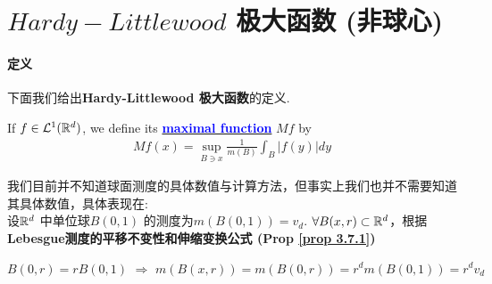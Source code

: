 \newpage
\section{$Hardy-Littlewood$ 极大函数 (非球心)}
\paragraph{定义}
	下面我们给出\textbf{Hardy-Littlewood 极大函数}的定义.
	\begin{defn}\label{def 4.1.1}
		If $f \in \mathcal{L}^{1}(\mathbb{R}^d)$, we define its \underline{\textcolor{blue}{\textbf{maximal function}}} $Mf$ by
		\begin{align}
			Mf(x) = \sup_{B \ni x}{\frac{1}{m(B)} \int_{B}{\left| f(y) \right| dy}}
		\end{align}
	
		\vspace{1em}
		\begin{rmk}
			我们目前并不知道球面测度的具体数值与计算方法，但事实上我们也并不需要知道其具体数值，具体表现在: \\
			设$\mathbb{R}^d$ 中单位球$B(0 , 1)$ 的测度为$m(B(0 , 1)) = v_d$. $\forall B(x , r) \subset \mathbb{R}^d$，根据\textbf{Lebesgue测度的平移不变性和伸缩变换公式 (Prop \ref{prop 3.7.1})}
			\begin{center}
				$B(0 , r) = r B(0 , 1) \,\, \Rightarrow \,\, m(B(x , r)) = m(B(0 , r)) = r^d m(B(0 , 1)) = r^d v_d$
			\end{center}
		\end{rmk}
	\end{defn}

\vspace{2em}
